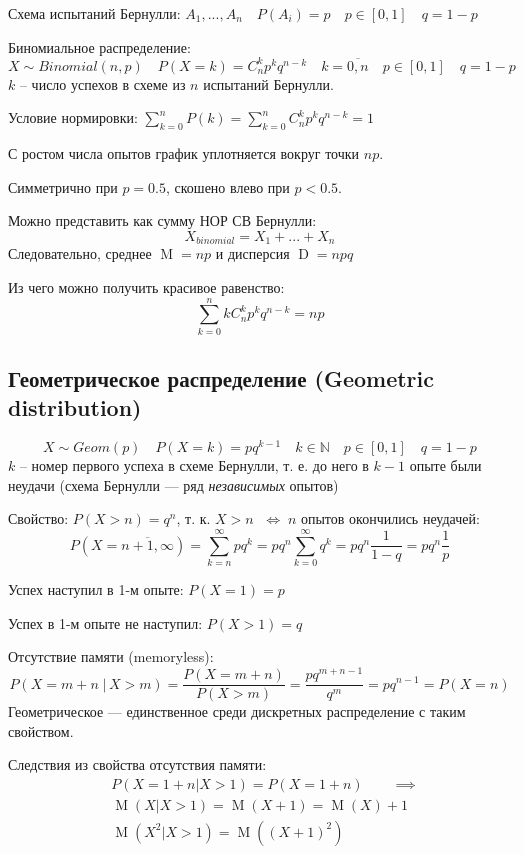 \documentclass[a4paper,12pt,fleqn]{article}
\newenvironment{onsamepage} {\begin{minipage}{\textwidth}} {\end{minipage}}
\numberwithin{figure}{section}
\theoremstyle{definition}
\let\DS\displaystyle
\def\N{\mathbb{N}}
\DeclareMathOperator{\M}{M}
\DeclareMathOperator{\D}{D}
\def\iff{$\;\Longleftrightarrow\;$}
\begin{document}
Схема испытаний Бернулли:
$A_1,...,A_n \quad P(A_i)=p \quad p\in[0,1] \quad q=1-p$

Биномиальное распределение:
\[ X \sim Binomial(n,p) \quad P(X=k)=C_n^k p^k q^{n-k}
   \quad k=\overline{0,n} \quad p\in[0,1] \quad q=1-p \]
$k$ -- число успехов в схеме из $n$ испытаний Бернулли.

Условие нормировки: $\DS \sum_{k=0}^n{P(k)} = \sum_{k=0}^n{C_n^k p^k q^{n-k}} = 1$

С ростом числа опытов график уплотняется вокруг точки $np$.

Симметрично при $p=0.5$, скошено влево при $p<0.5$.

Можно представить как сумму НОР СВ Бернулли:
\[ X_{binomial} = X_1 + ... + X_n \]
Следовательно, среднее $\M = np$ и дисперсия $\D = npq$

Из чего можно получить красивое равенство:
\[ \sum_{k=0}^n k C_n^k p^k q^{n-k} = np \]


\subsection{Геометрическое распределение (Geometric distribution)}

\[ X \sim Geom(p) \quad P(X=k)=pq^{k-1} \quad
k\in\N \quad p\in[0,1] \quad q=1-p \]
$k$ -- номер первого успеха в схеме Бернулли, т. е. до него в $k-1$ опыте были неудачи
(схема Бернулли --- ряд \textit{независимых} опытов)

Свойство: $P(X>n) = q^n$, т. к. $X>n$ \iff $n$ опытов окончились неудачей:
  \[ P(X=\overline{n+1,\infty}) = \sum_{k=n}^{\infty}pq^k
       = pq^n \sum_{k=0}^{\infty} q^k = pq^n\frac1{1-q} = pq^n\frac1p \]

Успех наступил в 1-м опыте: $P(X=1) = p$

Успех в 1-м опыте не наступил: $P(X>1) = q$

Отсутствие памяти (memoryless):
\[ P(X=m+n \;|\, X>m) = \dfrac{P(X=m+n)}{P(X>m)}
   = \dfrac{pq^{m+n-1}}{q^m} = pq^{n-1} = P(X=n) \]
Геометрическое --- единственное среди дискретных распределение с таким свойством.

\begin{onsamepage}
Следствия из свойства отсутствия памяти:
\begin{align*}
&	P(X=1+n|X>1) = P(X=1+n)  \qquad \implies \\
&	\M(X|X>1) = \M(X+1) = \M(X)+1  \\
&	\M(X^2|X>1) = \M\left( (X+1)^2 \right)
\end{align*}
\end{onsamepage}
\end{document}
